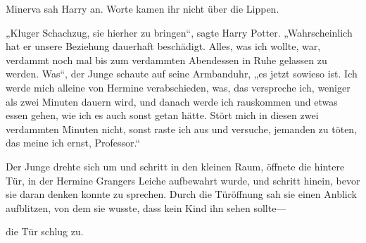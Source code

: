 
Minerva sah Harry an. Worte kamen ihr nicht über die Lippen.

„Kluger Schachzug, sie hierher zu bringen“, sagte Harry Potter. „Wahrscheinlich hat er unsere Beziehung dauerhaft beschädigt. Alles, was ich wollte, war, verdammt noch mal bis zum verdammten Abendessen in Ruhe gelassen zu werden. Was“, der Junge schaute auf seine Armbanduhr, „es jetzt sowieso ist. Ich werde mich alleine von Hermine verabschieden, was, das verspreche ich, weniger als zwei Minuten dauern wird, und danach werde ich rauskommen und etwas essen gehen, wie ich es auch sonst getan hätte. Stört mich in diesen zwei verdammten Minuten nicht, sonst raste ich aus und versuche, jemanden zu töten, das meine ich ernst, Professor.“

Der Junge drehte sich um und schritt in den kleinen Raum, öffnete die hintere Tür, in der Hermine Grangers Leiche aufbewahrt wurde, und schritt hinein, bevor sie daran denken konnte zu sprechen. Durch die Türöffnung sah sie einen Anblick aufblitzen, von dem sie wusste, dass kein Kind ihn sehen sollte—

die Tür schlug zu.



